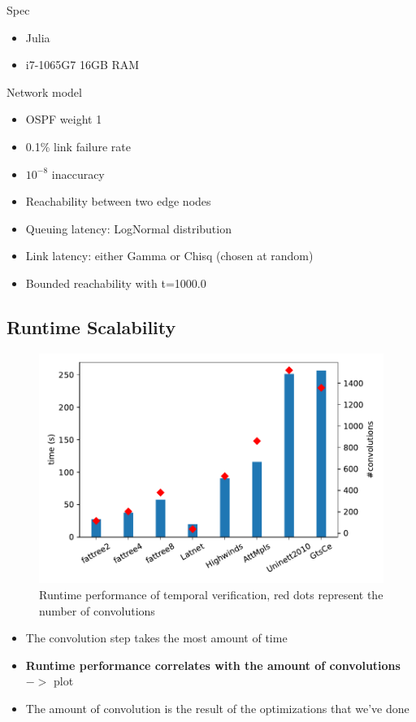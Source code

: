 \documentclass[10pt,sigconf,letterpaper,anonymous,nonacm]{acmart}
\begin{document}
Spec
\begin{itemize}
    \item Julia
    \item i7-1065G7 16GB RAM
\end{itemize}

Network model
\begin{itemize}
    \item OSPF weight 1
    \item 0.1\% link failure rate
    \item $10^{-8}$ inaccuracy
    \item Reachability between two edge nodes
    \item Queuing latency: LogNormal distribution
    \item Link latency: either Gamma or Chisq (chosen at random)
    \item Bounded reachability with t=1000.0
\end{itemize}

\subsection{Runtime Scalability}

\begin{figure}[h]
    \centering
    \includegraphics[scale=0.5]{scalability}
    \caption{Runtime performance of temporal verification, red dots represent the number of convolutions}
    \label{fig:scalability}
\end{figure}

\begin{itemize}
    \item The convolution step takes the most amount of time
    \item \textbf{Runtime performance correlates with the amount of convolutions} $->$ plot
    \item The amount of convolution is the result of the optimizations that we've done
\end{itemize}
\end{document}
